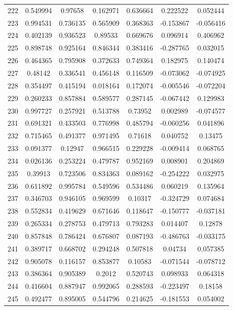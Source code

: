 \begin{table}
\begin{tabular}{c|c|c|c|c|c|c}
222 & 0.549994 & 0.97658 & 0.162971 & 0.636664 & 0.222522 & 0.052444\\
223 & 0.994531 & 0.736135 & 0.565909 & 0.368363 & -0.153867 & -0.056416\\
224 & 0.402139 & 0.936523 & 0.89533 & 0.669676 & 0.096914 & 0.406962\\
225 & 0.898748 & 0.925164 & 0.846344 & 0.383416 & -0.287765 & 0.032015\\
226 & 0.464365 & 0.795908 & 0.372633 & 0.749364 & 0.182975 & 0.140474\\
227 & 0.48142 & 0.336541 & 0.456148 & 0.116509 & -0.073062 & -0.074925\\
228 & 0.354497 & 0.415194 & 0.018164 & 0.172074 & -0.005546 & -0.072204\\
229 & 0.260233 & 0.857884 & 0.589577 & 0.287145 & -0.067442 & 0.129983\\
230 & 0.997727 & 0.257921 & 0.513788 & 0.73952 & 0.002989 & -0.074577\\
231 & 0.691321 & 0.433503 & 0.776998 & 0.485794 & -0.060256 & 0.041896\\
232 & 0.715465 & 0.491377 & 0.971495 & 0.71618 & 0.040752 & 0.13475\\
233 & 0.091377 & 0.12947 & 0.966515 & 0.229228 & -0.009414 & 0.068765\\
234 & 0.026136 & 0.253224 & 0.479787 & 0.952169 & 0.008901 & 0.204869\\
235 & 0.39913 & 0.723506 & 0.834363 & 0.089162 & -0.254222 & 0.032975\\
236 & 0.611892 & 0.995784 & 0.549596 & 0.534486 & 0.060219 & 0.135964\\
237 & 0.346703 & 0.946105 & 0.969599 & 0.10317 & -0.324729 & 0.074684\\
238 & 0.552834 & 0.419629 & 0.671646 & 0.118647 & -0.150777 & -0.037181\\
239 & 0.265334 & 0.278753 & 0.479713 & 0.793283 & 0.014407 & 0.12878\\
240 & 0.857848 & 0.786424 & 0.676807 & 0.087193 & -0.486763 & -0.033175\\
241 & 0.389717 & 0.668702 & 0.294248 & 0.507818 & 0.04734 & 0.057385\\
242 & 0.905078 & 0.116157 & 0.853877 & 0.10583 & -0.071544 & -0.078712\\
243 & 0.386364 & 0.905389 & 0.2012 & 0.520743 & 0.098933 & 0.064318\\
244 & 0.416604 & 0.887947 & 0.992065 & 0.288593 & -0.223497 & 0.18158\\
245 & 0.492477 & 0.895005 & 0.544796 & 0.214625 & -0.181553 & 0.054002\\

\end{tabular}
\end{table}
